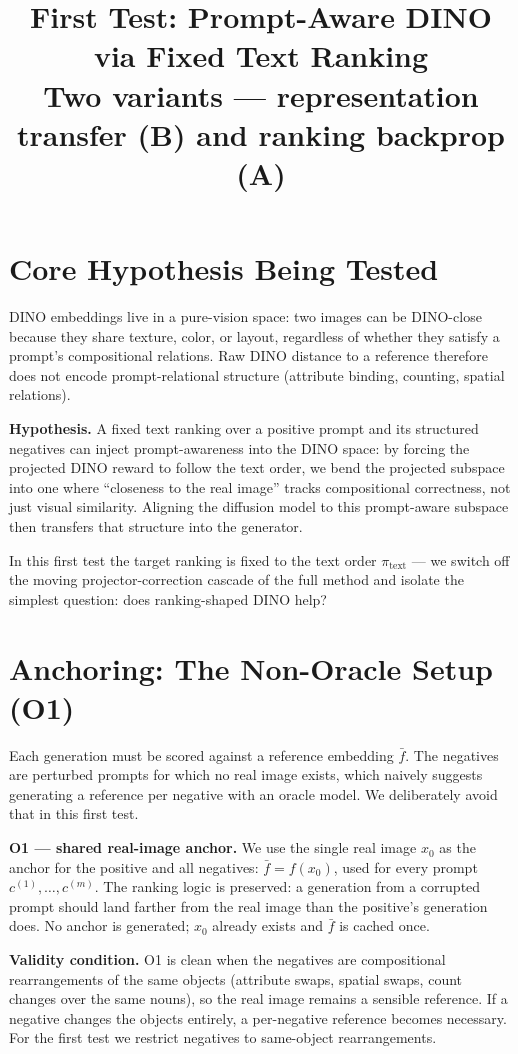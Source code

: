 \documentclass[11pt]{article}
\title{\textbf{First Test: Prompt-Aware DINO via Fixed Text Ranking}\\[0.3em]
\large Two variants --- representation transfer (B) and ranking backprop (A)}
\author{}
\date{}
\begin{document}
\maketitle

\section{Core Hypothesis Being Tested}
DINO embeddings live in a pure-vision space: two images can be DINO-close because they share texture, color, or layout, regardless of whether they satisfy a prompt's compositional relations. Raw DINO distance to a reference therefore does not encode prompt-relational structure (attribute binding, counting, spatial relations).

\textbf{Hypothesis.} A fixed text ranking over a positive prompt and its structured negatives can inject prompt-awareness into the DINO space: by forcing the projected DINO reward to follow the text order, we bend the projected subspace into one where ``closeness to the real image'' tracks compositional correctness, not just visual similarity. Aligning the diffusion model to this prompt-aware subspace then transfers that structure into the generator.

In this first test the target ranking is fixed to the text order $\pi_{\text{text}}$ --- we switch off the moving projector-correction cascade of the full method and isolate the simplest question: does ranking-shaped DINO help?

\section{Anchoring: The Non-Oracle Setup (O1)}
Each generation must be scored against a reference embedding $\bar{f}$. The negatives are perturbed prompts for which no real image exists, which naively suggests generating a reference per negative with an oracle model. We deliberately avoid that in this first test.

\textbf{O1 --- shared real-image anchor.} We use the single real image $x_0$ as the anchor for the positive and all negatives:
$\bar{f} = f(x_0)$, used for every prompt $c^{(1)}, \dots, c^{(m)}$.
The ranking logic is preserved: a generation from a corrupted prompt should land farther from the real image than the positive's generation does. No anchor is generated; $x_0$ already exists and $\bar{f}$ is cached once.

\textbf{Validity condition.} O1 is clean when the negatives are compositional rearrangements of the same objects (attribute swaps, spatial swaps, count changes over the same nouns), so the real image remains a sensible reference. If a negative changes the objects entirely, a per-negative reference becomes necessary. For the first test we restrict negatives to same-object rearrangements.
\end{document}
